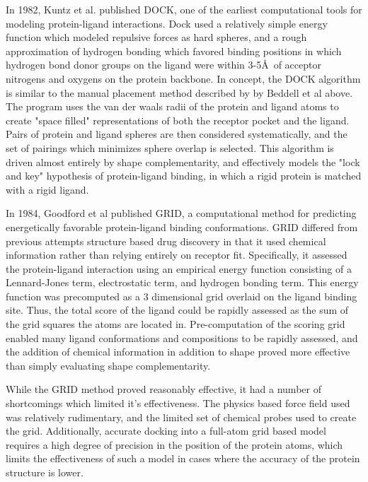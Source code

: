 In 1982, Kuntz et al. published DOCK, one of the earliest computational tools for modeling protein-ligand interactions\citep{Kuntz:1982wx}.  Dock used a relatively simple energy function which modeled repulsive forces as hard spheres, and a rough approximation of hydrogen bonding which favored binding positions in which hydrogen bond donor groups on the ligand were within 3-5\AA\ of acceptor nitrogens and oxygens on the protein backbone.
In concept, the DOCK algorithm is similar to the manual placement method described by by Beddell et al above. 
The program uses the van der waals radii of the protein and ligand atoms to create "space filled" representations of both the receptor pocket and the ligand.
Pairs of protein and ligand spheres are then considered systematically, and the set of pairings which minimizes sphere overlap is selected.
This algorithm is driven almost entirely by shape complementarity, and effectively models the "lock and key" hypothesis of protein-ligand binding, in which a rigid protein is matched with a rigid ligand.

In 1984, Goodford et al published GRID, a computational method for predicting energetically favorable protein-ligand binding conformations\citep{Goodford:1985bf}.
GRID differed from previous attempts structure based drug discovery in that it used chemical information rather than relying entirely on receptor fit. 
Specifically, it assessed the protein-ligand interaction using an empirical energy function consisting of a Lennard-Jones term, electrostatic term, and hydrogen bonding term.
This energy function was precomputed as a 3 dimensional grid overlaid on the ligand binding site.
Thus, the total score of the ligand could be rapidly assessed as the sum of the grid squares the atoms are located in.
Pre-computation of the scoring grid enabled many ligand conformations and compositions to be rapidly assessed, and the addition of chemical information in addition to shape proved more effective than simply evaluating shape complementarity.

While the GRID method proved reasonably effective, it had a number of shortcomings which limited it's effectiveness.
The physics based force field used was relatively rudimentary, and the limited set of chemical probes used to create the grid.
Additionally, accurate docking into a full-atom grid based model requires a high degree of precision in the position of the protein atoms, which limits the effectiveness of such a model in cases where the accuracy of the protein structure is lower.

